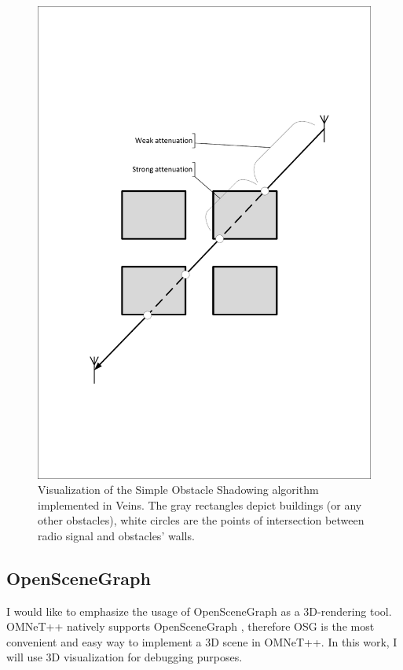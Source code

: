 \documentclass[]{nsm-thesis}
\begin{document}
\begin{figure}
	\centering
	\includegraphics[width=1\textwidth]{figures/SimpleObstacleShadowing.pdf}
	\caption{Visualization of the Simple Obstacle Shadowing algorithm implemented in Veins. The gray rectangles depict buildings (or any other obstacles), white circles are the points of intersection between radio signal and obstacles' walls.}
	\label{fig:SimpleObstacleShadowing}
\end{figure}

\subsection{OpenSceneGraph}

I would like to emphasize the usage of OpenSceneGraph \cite{osg} as a 3D-rendering tool.  OMNeT++ natively supports OpenSceneGraph \cite{omnetpposg}, therefore \ac{OSG} is the most convenient and easy way to implement a 3D scene in OMNeT++. In this work, I will use 3D visualization for debugging purposes.
\end{document}
